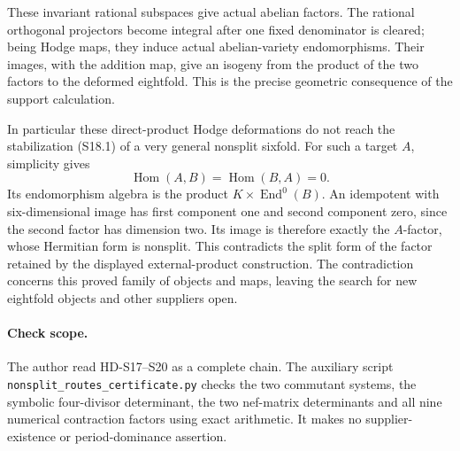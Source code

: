These invariant rational subspaces give actual abelian factors.
The rational orthogonal projectors become integral after one
fixed denominator is cleared; being Hodge maps, they induce
actual abelian-variety endomorphisms. Their images, with the
addition map, give an isogeny from the product of the two
factors to the deformed eightfold. This is the precise
geometric consequence of the support calculation.

In particular these direct-product Hodge deformations do not
reach the stabilization (S18.1) of a very general nonsplit
sixfold. For such a target \(A\), simplicity gives
\[
 \operatorname{Hom}(A,B)=\operatorname{Hom}(B,A)=0.
\]
Its endomorphism algebra is the product
\(K\times\operatorname{End}^0(B)\). An idempotent with
six-dimensional image has first component one and second
component zero, since the second factor has dimension two.
Its image is therefore exactly the \(A\)-factor, whose
Hermitian form is nonsplit. This contradicts the split form
of the factor retained by the displayed external-product
construction. The contradiction concerns this proved family
of objects and maps, leaving the search for new eightfold
objects and other suppliers open.

\paragraph{Check scope.}
The author read HD-S17--S20 as a complete chain. The auxiliary
script \texttt{nonsplit\_routes\_certificate.py} checks the
two commutant systems, the symbolic four-divisor determinant,
the two nef-matrix determinants and all nine numerical
contraction factors using exact arithmetic. It makes no
supplier-existence or period-dominance assertion.
